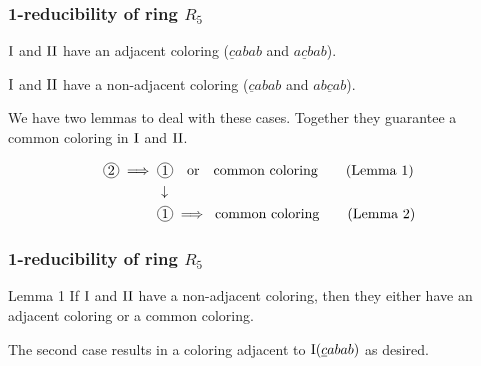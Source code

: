 \begin{frame}
    \frametitle{1-reducibility of ring $R_5$}

    \begin{enumerate}
        {\item $\text{I}$ and $\text{II}$ have an adjacent coloring ($\underline{c}abab$ and $a\underline{c}bab$).}
        {\item $\text{I}$ and $\text{II}$ have a non-adjacent coloring ($\underline{c}abab$ and $ab\underline{c}ab$).}
    \end{enumerate}

    \vspace{0.5cm}
    We have two lemmas to deal with these cases. Together they guarantee a common coloring in $\text{I}$ and $\text{II}$.

    \begin{equation*}
        \begin{aligned}
        \circled{2} \implies\; &\circled{1}\quad \text{or} \quad \text{common coloring} \quad\quad \text{(Lemma 1)} \\
        &\downarrow \\
        &\circled{1} \implies\;\text{common coloring}\quad\quad \text{(Lemma 2)}
        \end{aligned}
    \end{equation*}
    
\end{frame}

\begin{frame}
    \frametitle{1-reducibility of ring $R_5$}
    \begin{block}{Lemma 1}
        If $\text{I}$ and $\text{II}$ have a non-adjacent coloring, then they either have an adjacent coloring or a common coloring.
    \end{block}

    The second case results in a coloring adjacent to $\text{I}(\underline{c}abab)$ as desired.
\end{frame}


